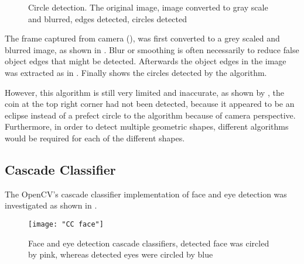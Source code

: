 \begin{figure}[H]
  \centering
  \caption{Circle detection.  The original image,  image converted to gray scale and blurred,  edges detected,  circles detected}
  \label{Figure:circles}
\end{figure}

The frame captured from camera (), was first converted to a grey scaled and blurred image, as shown in . Blur or smoothing is often necessarily to reduce false object edges that might be detected. Afterwards the object edges in the image was extracted as in . Finally  shows the circles detected by the algorithm.

However, this algorithm is still very limited and inaccurate, as shown by , the coin at the top right corner had not been detected, because it appeared to be an eclipse instead of a prefect circle to the algorithm because of camera perspective. Furthermore, in order to detect multiple geometric shapes, different algorithms would be required for each of the different shapes.

\subsection{Cascade Classifier}


The OpenCV's cascade classifier implementation \cite{opencv:cc} of face and eye detection was investigated as shown in .

\begin{figure}[H]
  \centering
  \texttt{[image: "CC face"]}
  \caption{Face and eye detection cascade classifiers, detected face was circled by pink, whereas detected eyes were circled by blue}
  \label{Figure:cc_face}
\end{figure}

